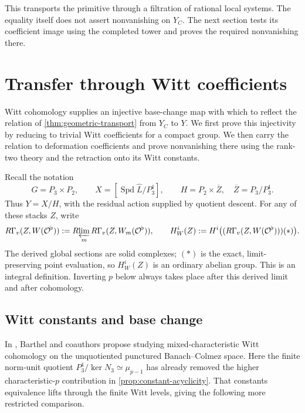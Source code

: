 \documentclass[11pt]{article}
\numberwithin{equation}{section}
\theoremstyle{definition}
\theoremstyle{remark}
\begin{document}
This transports the primitive through a filtration of rational local
systems.  The equality itself does not assert nonvanishing on $Y_C$.
The next section tests its coefficient image using the completed
tower and proves the required nonvanishing there.

\section{Transfer through Witt coefficients}
\label{sec:witt-transfer}

Witt cohomology supplies an injective base-change map with which to
reflect the relation of \cref{thm:geometric-transport} from $Y_C$ to
$Y$. We first prove this injectivity by reducing to trivial Witt
coefficients for a compact group. We then carry the relation to
deformation coefficients and prove nonvanishing there using the
rank-two theory and the retraction onto its Witt constants.

Recall the notation
\[
 G=P_3\times P_2,\qquad
 X=[\operatorname{Spd}\widehat L/P_3^1],\qquad
 H=P_2\times\overline Z,
 \quad \overline Z=P_3/P_3^1.
\]
Thus $Y=X/H$, with the residual action supplied by quotient
descent.  For any of these stacks $Z$, write
\[
 R\Gamma_v(Z,W(\mathcal O^\flat))
   :=R\!\varprojlim_m R\Gamma_v(Z,W_m(\mathcal O^\flat)),
 \qquad
 H_W^i(Z):=H^i\bigl((R\Gamma_v(Z,W(\mathcal O^\flat)))(*)\bigr).
\]
The derived global sections are solid complexes; \((*)\) is the exact,
limit-preserving point evaluation, so \(H_W^i(Z)\) is an ordinary abelian
group. This is an integral definition. Inverting $p$ below always takes
place after this derived limit and after cohomology.

\subsection{Witt constants and base change}

In \cite[Remark~3.6.12(2)]{BMR2026}, Barthel and coauthors propose
studying mixed-characteristic Witt cohomology on the unquotiented
punctured Banach--Colmez space. Here the finite norm-unit quotient
$P_3^1/\ker N_3\simeq\mu_{p-1}$ has already removed the higher
characteristic-$p$ contribution in \cref{prop:constant-acyclicity}.
That constants equivalence lifts through the finite Witt levels,
giving the following more restricted comparison.
\end{document}
